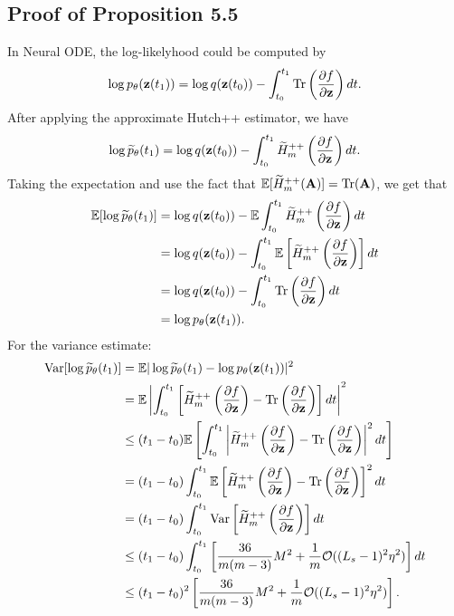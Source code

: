 \subsection{Proof of Proposition 5.5}
In Neural ODE, the log-likelyhood could be computed by 
\begin{equation}
  \log p_\theta (\mathbf{z}(t_1))=\log q(\mathbf{z}(t_0))-\int_{t_0}^{t_1}\mathrm{Tr}\left( \frac{\partial f}{\partial \mathbf{z}} \right)dt.
  \label{}
\end{equation}
After applying the approximate Hutch++ estimator, we have 
\begin{equation}
  \log \widetilde{p}_\theta(t_1)=\log q(\mathbf{z}(t_0))-\int_{t_0}^{t_1}\widetilde{H}^{++}_m\left( \frac{\partial f}{\partial \mathbf{z}} \right)dt.
  \label{}
\end{equation}
Taking the expectation and use the fact that $\mathbb{E}[\widetilde{H}^{++}_m({\bf A})]=\mathrm{Tr}({\bf A})$, we get that 
\begin{align*}
  \mathbb{E}[\log \widetilde{p}_\theta(t_1)]&=\log q(\mathbf{z}(t_0))-\mathbb{E}\int_{t_0}^{t_1}\widetilde{H}^{++}_m\left( \frac{\partial f}{\partial \mathbf{z}} \right)dt
  \\
  &=\log q(\mathbf{z}(t_0))-\int_{t_0}^{t_1}\mathbb{E}\left[ \widetilde{H}^{++}_m\left( \frac{\partial f}{\partial \mathbf{z}} \right) \right]dt\\
  &=\log q(\mathbf{z}(t_0))-\int_{t_0}^{t_1} \mathrm{Tr}\left( \frac{\partial f}{\partial \mathbf{z}} \right)dt\\
  &=\log p_\theta(\mathbf{z}(t_1)).
\end{align*}
For the variance estimate:
\begin{align*}
  \mathrm{Var}[\log \widetilde{p}_\theta(t_1)]&=\mathbb{E}|\log \widetilde{p}_\theta(t_1)-\log p_\theta(\mathbf{z}(t_1))|^2\\
  &=\mathbb{E}\left|\int_{t_0}^{t_1}\left[\widetilde{H}^{++}_m\left( \frac{\partial f}{\partial \mathbf{z}} \right)-\mathrm{Tr}\left( \frac{\partial f}{\partial \mathbf{z}} \right)\right]dt\right|^2\\
  &\le (t_1-t_0)\mathbb{E}\left[\int_{t_0}^{t_1}\left|\widetilde{H}^{++}_m\left( \frac{\partial f}{\partial \mathbf{z}} \right)-\mathrm{Tr}\left( \frac{\partial f}{\partial \mathbf{z}} \right)\right|^2 dt\right]\\
  &=(t_1-t_0)\int_{t_0}^{t_1}\mathbb{E}\left[ \widetilde{H}^{++}_m\left( \frac{\partial f}{\partial \mathbf{z}} \right)-\mathrm{Tr}\left( \frac{\partial f}{\partial \mathbf{z}} \right) \right]^2 dt\\
  &= (t_1-t_0)\int_{t_0}^{t_1}\mathrm{Var}\left[ \widetilde{H}^{++}_m\left( \frac{\partial f}{\partial \mathbf{z}} \right) \right]dt\\
  &\le (t_1-t_0)\int_{t_0}^{t_1}\left[\frac{36}{m(m-3)}M^2+\frac{1}{m}\mathcal{O}((L_s-1)^2\eta^2)\right]dt\\
  &\le (t_1-t_0)^2\left[ \frac{36}{m(m-3)}M^2+\frac{1}{m}\mathcal{O}((L_s-1)^2\eta^2) \right].
\end{align*}


